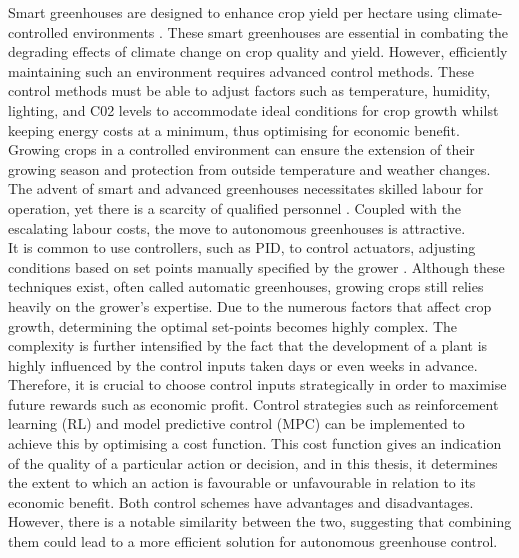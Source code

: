 Smart greenhouses are designed to enhance crop yield per hectare using climate-controlled environments \cite{morcegoReinforcementLearningModel2023}. These smart greenhouses are essential in combating the degrading effects of climate change on crop quality and yield. However, efficiently maintaining such an environment requires advanced control methods. These control methods must be able to adjust factors such as temperature, humidity, lighting, and C02 levels to accommodate ideal conditions for crop growth \cite{devopsGreenhouseClimateControl2021} whilst keeping energy costs at a minimum, thus optimising for economic benefit. Growing crops in a controlled environment can ensure the extension of their growing season and protection from outside temperature and weather changes. The advent of smart and advanced greenhouses necessitates skilled labour for operation, yet there is a scarcity of qualified personnel \cite{rusnakWhatCurrentState2018}. Coupled with the escalating labour costs, the move to autonomous greenhouses is attractive.\\


 It is common  to use controllers, such as PID, to control actuators, adjusting conditions based on set points manually specified by the grower \cite{zhangMethodologiesControlStrategies2020}. Although these techniques exist, often called automatic greenhouses, growing crops still relies heavily on the grower's expertise. Due to the numerous factors that affect crop growth, determining the optimal set-points becomes highly complex. The complexity is further intensified by the fact that the development of a plant is highly influenced by the control inputs taken days or even weeks in advance. Therefore, it is crucial to choose control inputs strategically in order to maximise future rewards such as economic profit. Control strategies such as reinforcement learning (RL) and model predictive control (MPC) can be implemented to achieve this by optimising a cost function. This cost function gives an indication of the quality of a particular action or decision, and in this thesis, it determines the extent to which an action is favourable or unfavourable in relation to its economic benefit. Both control schemes have advantages and disadvantages. However, there is a notable similarity between the two, suggesting that combining them could lead to a more efficient solution for autonomous greenhouse control.

